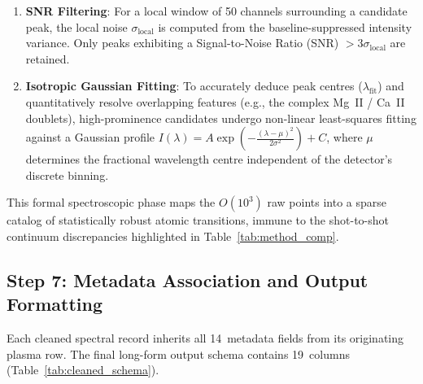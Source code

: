 \documentclass[a4paper,twocolumn,10pt]{article}
\begin{document}
\begin{enumerate}[nosep,leftmargin=*]
  \item \textbf{SNR Filtering}: For a local window of 50 channels surrounding
  a candidate peak, the local noise $\sigma_{\text{local}}$ is computed from
  the baseline-suppressed intensity variance. Only peaks exhibiting a
  Signal-to-Noise Ratio (SNR) $> 3\sigma_{\text{local}}$ are retained.
  \item \textbf{Isotropic Gaussian Fitting}: To accurately deduce peak centres
  ($\lambda_{\text{fit}}$) and quantitatively resolve overlapping features
  (e.g., the complex Mg~II / Ca~II doublets), high-prominence candidates
  undergo non-linear least-squares fitting against a Gaussian profile
  $I(\lambda) = A \exp\left(-\frac{(\lambda - \mu)^2}{2\sigma^2}\right) + C$,
  where $\mu$ determines the fractional wavelength centre independent of the
  detector's discrete binning.
\end{enumerate}

This formal spectroscopic phase maps the $O(10^3)$ raw points into a sparse
catalog of statistically robust atomic transitions, immune to the
shot-to-shot continuum discrepancies highlighted in Table~\ref{tab:method_comp}.

\subsection{Step 7: Metadata Association and Output Formatting}

Each cleaned spectral record inherits all 14~metadata fields from its
originating plasma row.  The final long-form output schema contains
19~columns (Table~\ref{tab:cleaned_schema}).
\end{document}
